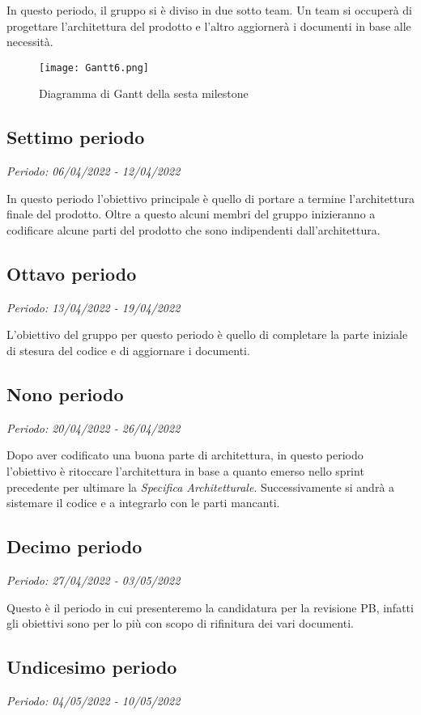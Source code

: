 In questo periodo, il gruppo si è diviso in due sotto team. Un team si occuperà di progettare l'architettura del prodotto e l'altro aggiornerà i documenti in base alle necessità.

\begin{figure}[H]
    \texttt{[image: Gantt6.png]}
    \caption{Diagramma di Gantt della sesta milestone}
\end{figure}

\subsection{Settimo periodo}
\textit{Periodo: 06/04/2022 - 12/04/2022}

In questo periodo l'obiettivo principale è quello di portare a termine l'architettura finale del prodotto. Oltre a questo alcuni membri del gruppo inizieranno a codificare alcune parti del prodotto che sono indipendenti dall'architettura.

\subsection{Ottavo periodo}
\textit{Periodo: 13/04/2022 - 19/04/2022}

L'obiettivo del gruppo per questo periodo è quello di completare la parte iniziale di stesura del codice e di aggiornare i documenti.

\subsection{Nono periodo}
\textit{Periodo: 20/04/2022 - 26/04/2022}

Dopo aver codificato una buona parte di architettura, in questo periodo l'obiettivo è ritoccare l'architettura in base a quanto emerso nello sprint precedente per ultimare la \textit{Specifica Architetturale}. Successivamente si andrà a sistemare il codice e a integrarlo con le parti mancanti.

\subsection{Decimo periodo}
\textit{Periodo: 27/04/2022 - 03/05/2022}

Questo è il periodo in cui presenteremo la candidatura per la revisione PB, infatti gli obiettivi sono per lo più con scopo di rifinitura dei vari documenti.

\subsection{Undicesimo periodo}
\textit{Periodo: 04/05/2022 - 10/05/2022}

